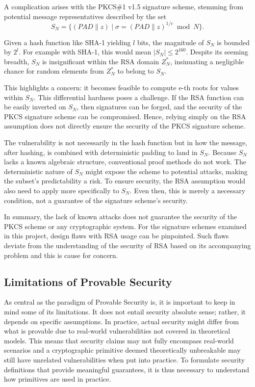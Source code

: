 \documentclass[]{final_report}
\theoremstyle{definition}
\begin{document}
A complication arises with the PKCS\#1 v1.5 signature scheme, stemming from potential message representatives described by the set
\[ S_N = \{ (PAD \| z) \mid \sigma = (PAD \| z)^{1/e} \bmod N \}. \]

Given a hash function like SHA-1 yielding $l$ bits, the magnitude of $S_N$ is bounded by $2^l$. For example with SHA-1, this would mean  $|S_N| \leq 2^{160}$. Despite its seeming breadth, $S_N$ is insignificant within the RSA domain \( Z_N^* \), insinuating a negligible chance for random elements from \( Z_N^* \) to belong to \( S_N \).

This highlights a concern: it becomes feasible to compute e-th roots for values within $S_N$. This differential hardness poses a challenge. If the RSA function can be easily inverted on  $S_N$, then signatures can be forged, and the security of the PKCS signature scheme can be compromised. Hence, relying simply on the RSA assumption does not directly ensure the security of the PKCS signature scheme. 

The vulnerability is not necessarily in the hash function but in how the message, after hashing, is combined with deterministic padding to land in \( S_N \). Because \( S_N \) lacks a known algebraic structure, conventional proof methods do not work. The deterministic nature of \( S_N \) might expose the scheme to potential attacks, making the subset's predictability a risk. To ensure security, the RSA assumption would also need to apply more specifically to  $S_N$. Even then, this is merely a necessary condition, not a guarantee of the signature scheme's security. 

In summary, the lack of known attacks does not guarantee the security of the PKCS scheme or any cryptographic system. For the signature schemes examined in this project, design flaws with RSA usage can be pinpointed. Such flaws deviate from the understanding of the security of RSA based on its accompanying problem and this is cause for concern.


\subsection{Limitations of Provable Security}
As central as the paradigm of Provable Security is, it is important to keep in mind some of its limitations. It does not entail security absolute sense; rather, it depends on specific assumptions. In practice, actual security might differ from what is provable due to real-world vulnerabilities not covered in theoretical models. This means that security claims may not fully encompass real-world scenarios and a cryptographic primitive deemed theoretically unbreakable may still have unrelated vulnerabilities when put into practice. To formulate security definitions that provide meaningful guarantees, it is thus necessary to understand how primitives are used in practice.
\end{document}
